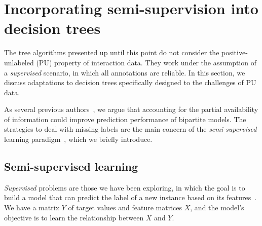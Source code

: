 \section{Incorporating semi-supervision into decision trees}
\label{sec:ss trees}


The tree algorithms presented up until this point do not consider the positive-unlabeled (PU) property of interaction data. They work under the assumption of a \emph{supervised} scenario, in which all annotations are reliable. In this section, we discuss adaptations to decision trees specifically designed to the challenges of PU data.
%


As several previous authors~\cite{pahikkala2015more,liu2017lpinrlmf,he2017simboost}, %
we argue that accounting for the partial availability of information
could improve prediction performance of bipartite models. %
The strategies to deal with missing labels are the main concern of the \emph{semi-supervised} learning paradigm~\cite{chapelle2006semisupervised,vanengelen2020survey,zhu2022introduction}, which we briefly introduce.


\subsection{Semi-supervised learning}
\label{sec:semi-supervised learning}

\emph{Supervised} problems are those we have been exploring, in which the
goal is to build a model that can predict the label of a new instance based on its features~\cite[p.~9]{hastie2001elements}. We have a matrix $Y$ of target values and feature matrices $X$, and the model's objective is to learn the relationship between $X$ and $Y$.

